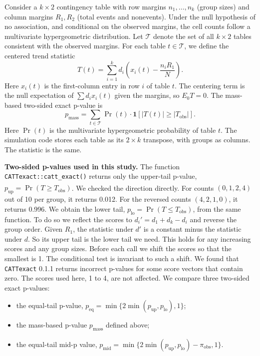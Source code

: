 \documentclass[
  11pt,
]{article}
\newcounter{none} %
\providecommand{\tightlist}{%
  \setlength{\itemsep}{0pt}\setlength{\parskip}{0pt}}
\begin{document}
Consider a \(k \times 2\) contingency table with row
margins \(n_1, \ldots, n_k\) (group sizes) and column
margins \(R_1, R_2\) (total events and nonevents). Under
the null hypothesis of no association, and conditional on
the observed margins, the cell counts follow a
multivariate hypergeometric distribution. Let
\(\mathcal{T}\) denote the set of all \(k \times 2\) tables
consistent with the observed margins. For each table
\(t \in \mathcal{T}\), we define the centered trend
statistic
\[T(t) = \sum_{i=1}^{k} d_i
  \left(x_i(t) - \frac{n_i R_1}{N}\right).\]
Here \(x_i(t)\) is the first-column entry in row \(i\) of
table \(t\). The centering term is the null expectation of
\(\sum d_i x_i(t)\) given the margins, so \(E_0 T = 0\). The
mass-based two-sided exact p-value is
\[p_{\text{mass}} = \sum_{t \in \mathcal{T}}
    \Pr(t) \cdot
    \mathbf{1}\!\left[|T(t)| \geq |T_{\text{obs}}|\right].\]
Here \(\Pr(t)\) is the multivariate hypergeometric
probability of table \(t\). The simulation code stores each
table as its \(2 \times k\) transpose, with groups as
columns. The statistic is the same.

\textbf{Two-sided p-values used in this study.} The function
\texttt{CATTexact::catt\_exact()} returns only the upper-tail
p-value, \(p_{\text{up}} = \Pr(T \geq T_{\text{obs}})\)\textsuperscript{}. We checked the direction
directly. For counts \((0, 1, 2, 4)\) out of 10 per group,
it returns 0.012. For the reversed counts \((4, 2, 1, 0)\),
it returns 0.996. We obtain the lower tail,
\(p_{\text{lo}} = \Pr(T \leq T_{\text{obs}})\), from the
same function. To do so we reflect the scores to
\(d_i' = d_1 + d_k - d_i\) and reverse the group order.
Given \(R_1\), the statistic under \(d'\) is a constant minus
the statistic under \(d\). So its upper tail is the lower
tail we need. This holds for any increasing scores and
any group sizes. Before each call we shift the scores so
that the smallest is 1. The conditional test is invariant
to such a shift. We found that \texttt{CATTexact} 0.1.1 returns
incorrect p-values for some score vectors that contain
zero. The scores used here, 1 to 4, are not affected.
We compare three two-sided exact
p-values:

\begin{itemize}
\tightlist
\item
  the equal-tail p-value,
  \(p_{\text{eq}} = \min\{2 \min(p_{\text{up}},
  p_{\text{lo}}), 1\}\);
\item
  the mass-based p-value \(p_{\text{mass}}\) defined above;
\item
  the equal-tail mid-p value\textsuperscript{},
  \(p_{\text{mid}} = \min\{2 \min(p_{\text{up}},
  p_{\text{lo}}) - \pi_{\text{obs}}, 1\}\).
\end{itemize}
\end{document}
